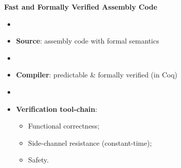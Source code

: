 \begin{block}{\bf Fast and Formally Verified Assembly Code}
	\begin{itemize}
		\item[]
		\item \textbf{Source}: assembly code with formal semantics
		\item[]
		\item \textbf{Compiler}: predictable \& formally verified (in Coq)
		\item[]
		\item \textbf{Verification tool-chain}: \begin{itemize}
			\item Functional correctness;
			\item Side-channel resistance (constant-time);
			\item Safety.
		\end{itemize}
	\end{itemize}
\end{block}